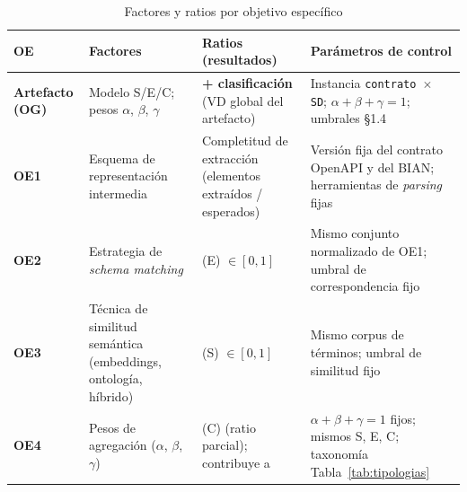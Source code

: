 \begin{table}[H]
  \centering
  \caption{Factores y ratios por objetivo específico}
  \label{tab:variables}
  \small
  \begin{tabular}{@{}p{}p{}p{}p{}@{}}
    \toprule
    \textbf{OE} & \textbf{Factores} & \textbf{Ratios (resultados)} & \textbf{Parámetros de control} \\
    \midrule
    \textbf{Artefacto (OG)} &
    Modelo S/E/C; pesos $\alpha$, $\beta$, $\gamma$ &
    \textbf{\AlignmentScore{} + clasificación} (VD global del artefacto) &
    Instancia \texttt{contrato $\times$ SD}; $\alpha+\beta+\gamma=1$; umbrales §1.4 \\
    \midrule
    \textbf{OE1} &
    Esquema de representación intermedia &
    Completitud de extracción (elementos extraídos / esperados) &
    Versión fija del contrato OpenAPI y del \ServiceDomain{} BIAN; herramientas de \textit{parsing} fijas \\
    \textbf{OE2} &
    Estrategia de \textit{schema matching} &
    \StructuralScore{} (E) $\in [0, 1]$ &
    Mismo conjunto normalizado de OE1; umbral de correspondencia fijo \\
    \textbf{OE3} &
    Técnica de similitud semántica (embeddings, ontología, híbrido) &
    \SemanticScore{} (S) $\in [0, 1]$ &
    Mismo corpus de términos; umbral de similitud fijo \\
    \textbf{OE4} &
    Pesos de agregación ($\alpha$, $\beta$, $\gamma$) &
    \CoverageScore{} (C) (ratio parcial); contribuye a \AlignmentScore{} &
    $\alpha + \beta + \gamma = 1$ fijos; mismos S, E, C; taxonomía Tabla~\ref{tab:tipologias} \\
    \bottomrule
  \end{tabular}
\end{table}
